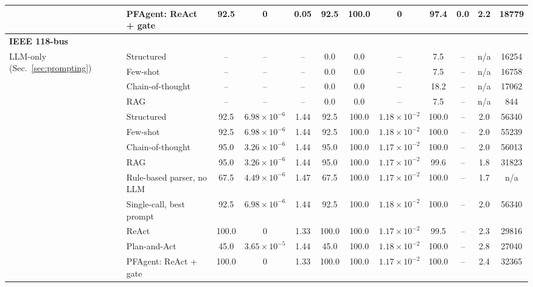 \begin{table}[!ht]
{\begin{tabular}{ll cccc cc cc cc}
 & PFAgent: ReAct + gate & 92.5 & 0 & 0.05 & 92.5 & 100.0 & 0 & 97.4 & 0.0 & 2.2 & 18779 \\
\midrule
\multicolumn{12}{l}{\textbf{IEEE 118-bus}} \\
\multirow{4}{*}{LLM-only (Sec.~\ref{sec:prompting})} & Structured & -- & -- & -- & 0.0 & 0.0 & -- & 7.5 & -- & n/a & 16254 \\
 & Few-shot & -- & -- & -- & 0.0 & 0.0 & -- & 7.5 & -- & n/a & 16758 \\
 & Chain-of-thought & -- & -- & -- & 0.0 & 0.0 & -- & 18.2 & -- & n/a & 17062 \\
 & RAG & -- & -- & -- & 0.0 & 0.0 & -- & 7.5 & -- & n/a & 844 \\
\addlinespace
\multirow{4}{*}{Single-call (Sec.~\ref{sec:prompting})} & Structured & 92.5 & $6.98{\times}10^{-6}$ & 1.44 & 92.5 & 100.0 & $1.18{\times}10^{-2}$ & 100.0 & -- & 2.0 & 56340 \\
 & Few-shot & 92.5 & $6.98{\times}10^{-6}$ & 1.44 & 92.5 & 100.0 & $1.18{\times}10^{-2}$ & 100.0 & -- & 2.0 & 55239 \\
 & Chain-of-thought & 95.0 & $3.26{\times}10^{-6}$ & 1.44 & 95.0 & 100.0 & $1.17{\times}10^{-2}$ & 100.0 & -- & 2.0 & 56013 \\
 & RAG & 95.0 & $3.26{\times}10^{-6}$ & 1.44 & 95.0 & 100.0 & $1.17{\times}10^{-2}$ & 99.6 & -- & 1.8 & 31823 \\
\addlinespace
\multirow{5}{*}{Architectures (Sec.~\ref{sec:agents})} & Rule-based parser, no LLM & 67.5 & $4.49{\times}10^{-6}$ & 1.47 & 67.5 & 100.0 & $1.17{\times}10^{-2}$ & 100.0 & -- & 1.7 & n/a \\
 & Single-call, best prompt & 92.5 & $6.98{\times}10^{-6}$ & 1.44 & 92.5 & 100.0 & $1.18{\times}10^{-2}$ & 100.0 & -- & 2.0 & 56340 \\
 & ReAct & 100.0 & 0 & 1.33 & 100.0 & 100.0 & $1.17{\times}10^{-2}$ & 99.5 & -- & 2.3 & 29816 \\
 & Plan-and-Act & 45.0 & $3.65{\times}10^{-5}$ & 1.44 & 45.0 & 100.0 & $1.18{\times}10^{-2}$ & 100.0 & -- & 2.8 & 27040 \\
 & PFAgent: ReAct + gate & 100.0 & 0 & 1.33 & 100.0 & 100.0 & $1.17{\times}10^{-2}$ & 100.0 & -- & 2.4 & 32365 \\
\bottomrule
\end{tabular}}
\end{table}
